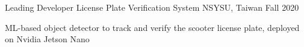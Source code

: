 \begin{cventries}
  \cventry
    {Leading Developer} %
    {License Plate Verification System} %
    {NSYSU, Taiwan} %
    {Fall 2020} %
    {
      \begin{cvitems} %
        \item {ML-based object detector to track and verify the scooter license plate, deployed on Nvidia Jetson Nano
        \hspace*{\fill}
        \href{https://youtu.be/jDKGAp2Puh0}{\faVideoCamera}
        \href{https://github.com/ernestchu/license-plate-verification-warning-system}{\faGithub}
        }
      \end{cvitems}
    }


\end{cventries}

